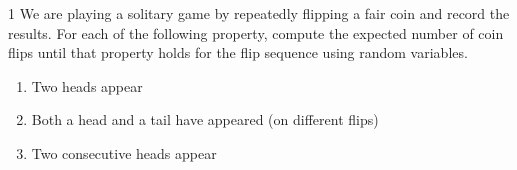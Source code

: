 \documentclass[12pt]{article}
\begin{document}


\begin{problem}{1}
    We are playing a solitary game by repeatedly flipping a fair coin and record the results. For each
    of the following property, compute the expected number of coin flips until that property holds
    for the flip sequence using random variables.

    \begin{enumerate}
        \item Two heads appear
        \item Both a head and a tail have appeared (on different flips)
        \item Two consecutive heads appear
    \end{enumerate}
\end{problem}
\end{document}
